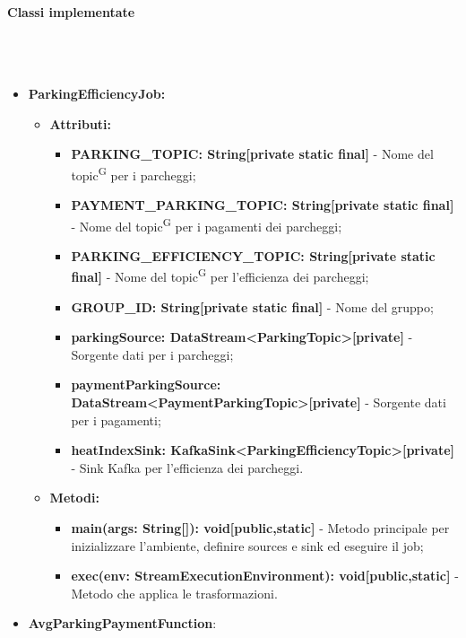 \documentclass[8pt]{article}
\newcommand{\glossterm}[1]{#1\textsuperscript{G}} %
\newcommand{\subsubsubsection}[1]{\paragraph{#1}\mbox{}\\\\}
\begin{document}
\subsubsubsection{Classi implementate}
\begin{itemize}
	\setlength\itemsep{0em}
    \item \textbf{ParkingEfficiencyJob:}
    \begin{itemize}
	\setlength\itemsep{0em}
        \item \textbf{Attributi:}
        \begin{itemize}
	\setlength\itemsep{0em}
            \item \textbf{PARKING\_TOPIC: String[private static final]} - Nome del \glossterm{topic} per i parcheggi;
            \item \textbf{PAYMENT\_PARKING\_TOPIC: String[private static final]} - Nome del \glossterm{topic} per i pagamenti dei parcheggi;
            \item \textbf{PARKING\_EFFICIENCY\_TOPIC: String[private static final]} - Nome del \glossterm{topic} per l'efficienza dei parcheggi;
            \item \textbf{GROUP\_ID: String[private static final]} - Nome del gruppo;
            \item \textbf{parkingSource: DataStream<ParkingTopic>[private]} - Sorgente dati per i parcheggi;
            \item \textbf{paymentParkingSource: DataStream<PaymentParkingTopic>[private]} - Sorgente dati per i pagamenti;
            \item \textbf{heatIndexSink: KafkaSink<ParkingEfficiencyTopic>[private]} - Sink Kafka per l'efficienza dei parcheggi.
        \end{itemize}
    \end{itemize}
    \begin{itemize}
	\setlength\itemsep{0em}
        \item \textbf{Metodi:}
        \begin{itemize}
	\setlength\itemsep{0em}
            \item \textbf{main(args: String[]): void[public,static]} - Metodo principale per inizializzare l'ambiente, definire sources e sink ed eseguire il job;
            \item \textbf{exec(env: StreamExecutionEnvironment): void[public,static]} - Metodo che applica le trasformazioni.
        \end{itemize}
    \end{itemize}
    \item \textbf{AvgParkingPaymentFunction}:
    \begin{itemize}
	\setlength\itemsep{0em}

\end{itemize}
\end{itemize}
\end{document}
